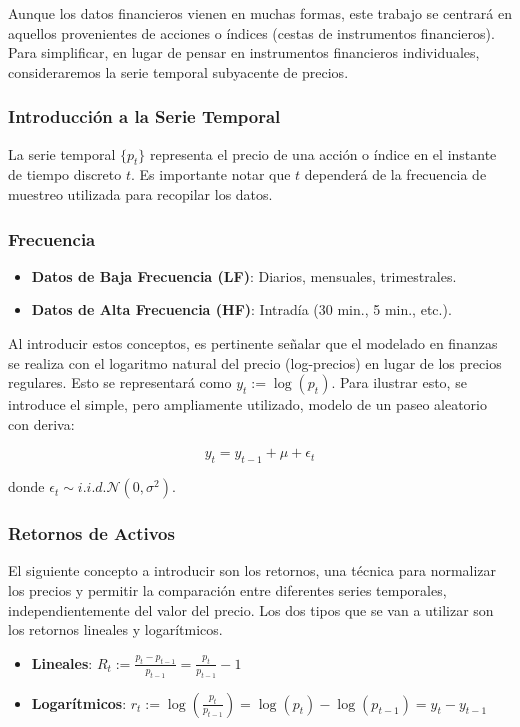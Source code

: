 \documentclass[a4paper,12pt, twoside]{report}
\begin{document}
Aunque los datos financieros vienen en muchas formas, este trabajo se centrará en aquellos provenientes de acciones o índices 
(cestas de instrumentos financieros). Para simplificar, en lugar de pensar en instrumentos financieros individuales, consideraremos 
la serie temporal subyacente de precios.

\subsubsection{Introducción a la Serie Temporal}

La serie temporal $\{p_t\}$ representa el precio de una acción o índice en el instante de tiempo discreto $t$. Es importante 
notar que $t$ dependerá de la frecuencia de muestreo utilizada para recopilar los datos.

\subsubsection{Frecuencia}

\begin{itemize}
    \item \textbf{Datos de Baja Frecuencia (LF)}: Diarios, mensuales, trimestrales.
    \item \textbf{Datos de Alta Frecuencia (HF)}: Intradía (30 min., 5 min., etc.).
\end{itemize}

Al introducir estos conceptos, es pertinente señalar que el modelado en finanzas se realiza con el logaritmo natural del precio 
(log-precios) en lugar de los precios regulares. Esto se representará como $y_t := \log(p_t)$. Para ilustrar esto, se 
introduce el simple, pero ampliamente utilizado, modelo de un paseo aleatorio con deriva:

\[
y_t = y_{t-1} + \mu + \epsilon_t
\]

donde $\epsilon_t \sim i.i.d. \mathcal{N}(0, \sigma^2)$.

\subsubsection{Retornos de Activos}

El siguiente concepto a introducir son los retornos, una técnica para normalizar los precios y permitir la comparación 
entre diferentes series temporales, independientemente del valor del precio. Los dos tipos que se van a utilizar son 
los retornos lineales y logarítmicos.

\begin{itemize}
    \item \textbf{Lineales}: $R_t := \frac{p_t - p_{t-1}}{p_{t-1}} = \frac{p_t}{p_{t-1}} - 1$
    \item \textbf{Logarítmicos}: $r_t := \log\left(\frac{p_t}{p_{t-1}}\right) = \log(p_t) - \log(p_{t-1}) = y_t - y_{t-1}$
\end{itemize}
\end{document}
